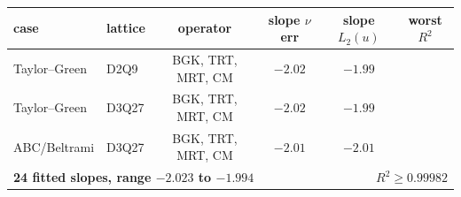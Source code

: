 \documentclass[11pt,a4paper]{article}
\begin{document}
\begin{center}\small
\begin{tabular}{llcccc}
\toprule
case & lattice & operator & slope $\nu$ err & slope $L_2(u)$ & worst $R^2$ \\
\midrule
Taylor--Green & D2Q9  & BGK, TRT, MRT, CM & $-2.02$ & $-1.99$ & \\
Taylor--Green & D3Q27 & BGK, TRT, MRT, CM & $-2.02$ & $-1.99$ & \\
ABC/Beltrami  & D3Q27 & BGK, TRT, MRT, CM & $-2.01$ & $-2.01$ & \\
\midrule
\multicolumn{4}{l}{\textbf{24 fitted slopes, range $-2.023$ to $-1.994$}}
  & \multicolumn{2}{r}{\textbf{$R^2 \geq 0.99982$}} \\
\bottomrule
\end{tabular}
\end{center}
\end{document}
